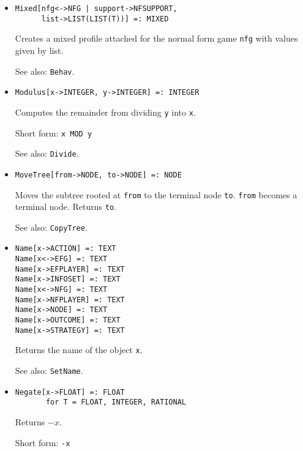 \begin{itemize}
\item
\protect \large \begin{verbatim}
Mixed[nfg<->NFG | support->NFSUPPORT, 
      list->LIST(LIST(T))] =: MIXED
\end{verbatim}\normalsize

\bd
Creates a mixed profile attached for the normal form game \verb+nfg+
with values given by list.  
\item
[See also:] {\tt Behav}.
\ed


\item
\protect \large \begin{verbatim}
Modulus[x->INTEGER, y->INTEGER] =: INTEGER
\end{verbatim}\normalsize

\bd
Computes the remainder from dividing \verb+y+ into \verb+x+.
\item
[Short form:] \verb+x MOD y+
\item
[See also:] {\tt Divide}.
\ed


\item
\protect \large \begin{verbatim}
MoveTree[from->NODE, to->NODE] =: NODE
\end{verbatim}\normalsize

\bd
Moves the subtree rooted at \verb+from+ to
the terminal node \verb+to+.  \verb+from+ becomes a terminal node.
Returns \verb+to+.
\item
[See also:] {\tt CopyTree}.
\ed


\item
\protect \large \begin{verbatim}
Name[x->ACTION] =: TEXT
Name[x<->EFG] =: TEXT
Name[x->EFPLAYER] =: TEXT
Name[x->INFOSET] =: TEXT
Name[x<->NFG] =: TEXT
Name[x->NFPLAYER] =: TEXT
Name[x->NODE] =: TEXT
Name[x->OUTCOME] =: TEXT
Name[x->STRATEGY] =: TEXT
\end{verbatim}\normalsize

\bd
Returns the name of the object \verb+x+.
\item
[See also:] {\tt SetName}.
\ed

\item 
\protect \large \begin{verbatim}
Negate[x->FLOAT] =: FLOAT
       for T = FLOAT, INTEGER, RATIONAL
\end{verbatim} \normalsize

\bd
Returns $-x$.
\item
[Short form:] \verb+-x+
\ed



\end{itemize}
